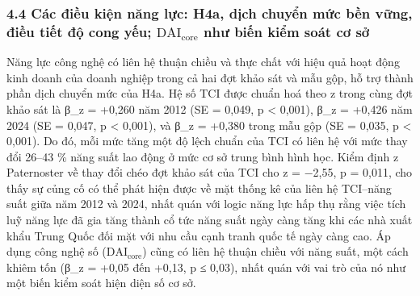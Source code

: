 \documentclass[12pt,a4paper]{article}
\begin{document}
\hypertarget{44-cuxe1c-ux111iux1ec1u-kiux1ec7n-nux103ng-lux1ef1c-h4a-dux1ecbch-chuyux1ec3n-mux1ee9c-bux1ec1n-vux1eefng-ux111iux1ec1u-tiux1ebft-ux111ux1ed9-cong-yux1ebfu-mathrmdai_textcore-nhux1b0-biux1ebfn-kiux1ec3m-souxe1t-cux1a1-sux1edf}{%
\subsubsection{\texorpdfstring{4.4 Các điều kiện năng lực: H4a, dịch
chuyển mức bền vững, điều tiết độ cong yếu;
\(\mathrm{DAI}_{\text{core}}\) như biến kiểm soát cơ
sở}{4.4 Các điều kiện năng lực: H4a, dịch chuyển mức bền vững, điều tiết độ cong yếu; \textbackslash mathrm\{DAI\}\_\{\textbackslash text\{core\}\} như biến kiểm soát cơ sở}}\label{44-cuxe1c-ux111iux1ec1u-kiux1ec7n-nux103ng-lux1ef1c-h4a-dux1ecbch-chuyux1ec3n-mux1ee9c-bux1ec1n-vux1eefng-ux111iux1ec1u-tiux1ebft-ux111ux1ed9-cong-yux1ebfu-mathrmdai_textcore-nhux1b0-biux1ebfn-kiux1ec3m-souxe1t-cux1a1-sux1edf}}

Năng lực công nghệ có liên hệ thuận chiều và thực chất với hiệu quả hoạt
động kinh doanh của doanh nghiệp trong cả hai đợt khảo sát và mẫu gộp,
hỗ trợ thành phần dịch chuyển mức của H4a. Hệ số TCI được chuẩn hoá theo
z trong cùng đợt khảo sát là β\_z = +0,260 năm 2012 (SE = 0,049, p
\textless{} 0,001), β\_z = +0,426 năm 2024 (SE = 0,047, p \textless{}
0,001), và β\_z = +0,380 trong mẫu gộp (SE = 0,035, p \textless{}
0,001). Do đó, mỗi mức tăng một độ lệch chuẩn của TCI có liên hệ với mức
thay đổi 26--43 \% năng suất lao động ở mức cơ sở trung bình hình học.
Kiểm định z Paternoster về thay đổi chéo đợt khảo sát của TCI cho z =
−2,55, p = 0,011, cho thấy sự củng cố có thể phát hiện được về mặt thống
kê của liên hệ TCI--năng suất giữa năm 2012 và 2024, nhất quán với logic
năng lực hấp thụ rằng việc tích luỹ năng lực đã gia tăng thành cổ tức
năng suất ngày càng tăng khi các nhà xuất khẩu Trung Quốc đối mặt với
nhu cầu cạnh tranh quốc tế ngày càng cao. Áp dụng công nghệ số
(\(\mathrm{DAI}_{\text{core}}\)) cũng có liên hệ thuận chiều với năng
suất, một cách khiêm tốn (β\_z = +0,05 đến +0,13, p ≤ 0,03), nhất quán
với vai trò của nó như một biến kiểm soát hiện diện số cơ sở.
\end{document}
